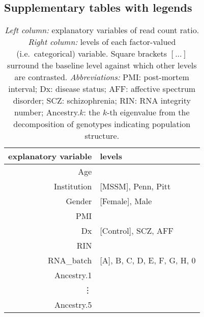 \documentclass[letterpaper]{article}
\begin{document}
\clearpage

\subsection{Supplementary tables with legends}

\setcounter{table}{0}
\makeatletter 
\renewcommand{\thetable}{S\@arabic\c@table}
\makeatother

\begin{table}[H]
\begin{center}
\begin{tabular}{r|l}
explanatory variable & levels\\
\hline
Age &  \\
Institution & [MSSM], Penn, Pitt\\
Gender & [Female], Male\\
PMI & \\
Dx & [Control], SCZ, AFF \\
RIN &  \\
RNA\_batch & [A], B, C, D, E, F, G, H, 0\\
Ancestry.1 & \\
\vdots & \\
Ancestry.5 &  \\
\end{tabular}
\caption{ \emph{Left column:} explanatory variables of read count
ratio.  \emph{Right column:} levels of each factor-valued (i.e.~categorical)
variable.  Square brackets \([...]\) surround the baseline level against
which other levels are contrasted.  \emph{Abbreviations:} PMI: post-mortem
interval; Dx: disease status; AFF: affective spectrum disorder; SCZ:
schizophrenia; RIN: RNA integrity number;
Ancestry.\(k\): the \(k\)-th eigenvalue from the decomposition of genotypes
indicating population structure.}
\label{tab:predictors}
\end{center}
\end{table}
\end{document}
